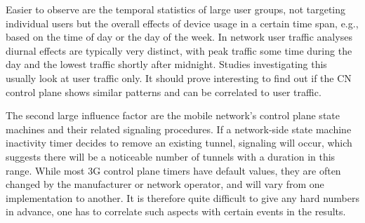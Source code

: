 Easier to observe are the temporal statistics of large user groups, not targeting individual users but the overall effects of device usage in a certain time span, e.g., based on the time of day or the day of the week. In network user traffic analyses diurnal effects are typically very distinct, with peak traffic some time during the day and the lowest traffic shortly after midnight. Studies investigating this usually look at user traffic only. It should prove interesting to find out if the \gls{CN} control plane shows similar patterns and can be correlated to user traffic.

The second large influence factor are the mobile network's control plane state machines and their related signaling procedures. If a network-side state machine inactivity timer decides to remove an existing tunnel, signaling will occur, which suggests there will be a noticeable number of tunnels with a duration in this range. While most \gls{3G} control plane timers have default values, they are often changed by the manufacturer or network operator, and will vary from one implementation to another. It is therefore quite difficult to give any hard numbers in advance, one has to correlate such aspects with certain events in the results.







